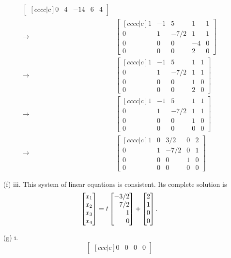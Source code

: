 \begin{exercises}
\begin{problist}
\begin{solution}
\begin{enumerate}
\begin{align*}
\begin{bmatrix}[cccc|c]
						0 & 4 & -14 & 6 & 4
					\end{bmatrix}\\
					\rightarrow
					&\begin{bmatrix}[cccc|c]
						1 & -1 & 5 & 1 & 1\\
						0 & 1 & -7/2 & 1 & 1\\
						0 & 0 & 0 & -4 & 0\\
						0 & 0 & 0 & 2 & 0
					\end{bmatrix}\\
					\rightarrow
					&\begin{bmatrix}[cccc|c]
						1 & -1 & 5 & 1 & 1\\
						0 & 1 & -7/2 & 1 & 1\\
						0 & 0 & 0 & 1 & 0\\
						0 & 0 & 0 & 2 & 0
					\end{bmatrix}\\
					\rightarrow
					&\begin{bmatrix}[cccc|c]
						1 & -1 & 5 & 1 & 1\\
						0 & 1 & -7/2 & 1 & 1\\
						0 & 0 & 0 & 1 & 0\\
						0 & 0 & 0 & 0 & 0
					\end{bmatrix}\\
					\rightarrow
					&\begin{bmatrix}[cccc|c]
						1 & 0 & 3/2 & 0 & 2\\
						0 & 1 & -7/2 & 0 & 1\\
						0 & 0 & 0 & 1 & 0\\
						0 & 0 & 0 & 0 & 0
					\end{bmatrix}
				\end{align*}
				\item[(f) iii.]
				This system of linear equations is consistent. Its complete solution is
				\[
					\mat{x_1\\x_2\\x_3\\x_4}=t\mat{-3/2\\7/2\\1\\0}+\mat{2\\1\\0\\0}.
				\]
				\item[(g) i.]
				\[
					\begin{bmatrix}[ccc|c]
						0 & 0 & 0 & 0
					\end{bmatrix}
				\]

\end{enumerate}
\end{solution}
\end{problist}
\end{exercises}
